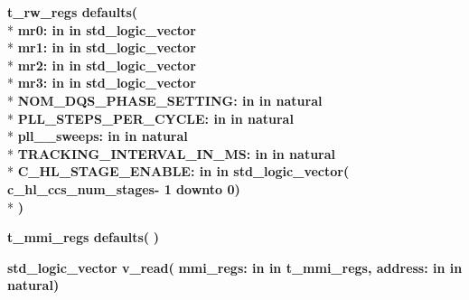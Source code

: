\begin{DoxyCompactItemize}
\item 
{\bfseries {\bfseries \textcolor{vhdlchar}{t\+\_\+rw\+\_\+regs}\textcolor{vhdlchar}{ }}} {\bf defaults}{\bfseries  ( }\\*
{\bfseries \textcolor{vhdlchar}{mr0\+: }\textcolor{stringliteral}{in }\textcolor{vhdlchar}{in std\+\_\+logic\+\_\+vector}}\\*
{\bfseries \textcolor{vhdlchar}{mr1\+: }\textcolor{stringliteral}{in }\textcolor{vhdlchar}{in std\+\_\+logic\+\_\+vector}}\\*
{\bfseries \textcolor{vhdlchar}{mr2\+: }\textcolor{stringliteral}{in }\textcolor{vhdlchar}{in std\+\_\+logic\+\_\+vector}}\\*
{\bfseries \textcolor{vhdlchar}{mr3\+: }\textcolor{stringliteral}{in }\textcolor{vhdlchar}{in std\+\_\+logic\+\_\+vector}}\\*
{\bfseries \textcolor{vhdlchar}{N\+O\+M\+\_\+\+D\+Q\+S\+\_\+\+P\+H\+A\+S\+E\+\_\+\+S\+E\+T\+T\+I\+N\+G\+: }\textcolor{stringliteral}{in }\textcolor{vhdlchar}{in natural}}\\*
{\bfseries \textcolor{vhdlchar}{P\+L\+L\+\_\+\+S\+T\+E\+P\+S\+\_\+\+P\+E\+R\+\_\+\+C\+Y\+C\+L\+E\+: }\textcolor{stringliteral}{in }\textcolor{vhdlchar}{in natural}}\\*
{\bfseries \textcolor{vhdlchar}{pll\+\_\+\_\+sweeps\+: }\textcolor{stringliteral}{in }\textcolor{vhdlchar}{in natural}}\\*
{\bfseries \textcolor{vhdlchar}{T\+R\+A\+C\+K\+I\+N\+G\+\_\+\+I\+N\+T\+E\+R\+V\+A\+L\+\_\+\+I\+N\+\_\+\+M\+S\+: }\textcolor{stringliteral}{in }\textcolor{vhdlchar}{in natural}}\\*
{\bfseries \textcolor{vhdlchar}{C\+\_\+\+H\+L\+\_\+\+S\+T\+A\+G\+E\+\_\+\+E\+N\+A\+B\+L\+E\+: }\textcolor{stringliteral}{in }\textcolor{vhdlchar}{in std\+\_\+logic\+\_\+vector(   c\+\_\+hl\+\_\+ccs\+\_\+num\+\_\+stages-\/ 1 downto  0)}}\\*
{\bfseries  )} 
\item 
{\bfseries {\bfseries \textcolor{vhdlchar}{t\+\_\+mmi\+\_\+regs}\textcolor{vhdlchar}{ }}} {\bf defaults}{\bfseries  ( }{\bfseries  )} 
\item 
{\bfseries {\bfseries \textcolor{comment}{std\+\_\+logic\+\_\+vector}\textcolor{vhdlchar}{ }}} {\bf v\+\_\+read}{\bfseries  ( }{\bfseries \textcolor{vhdlchar}{mmi\+\_\+regs\+: }\textcolor{stringliteral}{in }\textcolor{vhdlchar}{in t\+\_\+mmi\+\_\+regs}}{\bfseries  , \textcolor{vhdlchar}{address\+: }\textcolor{stringliteral}{in }\textcolor{vhdlchar}{in natural}}{\bfseries  )} 
\item 

\end{DoxyCompactItemize}
